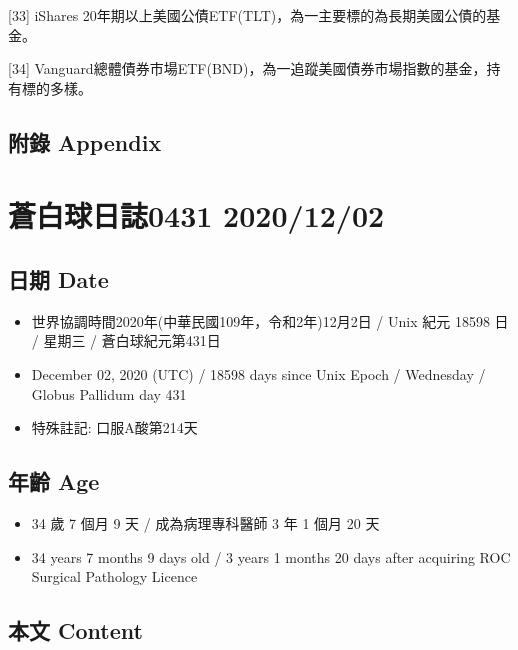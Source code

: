 \documentclass[
]{article}
\providecommand{\tightlist}{%
  \setlength{\itemsep}{0pt}\setlength{\parskip}{0pt}}
\begin{document}
{[}33{]} iShares
20年期以上美國公債ETF(TLT)，為一主要標的為長期美國公債的基金。

{[}34{]}
Vanguard總體債券市場ETF(BND)，為一追蹤美國債券市場指數的基金，持有標的多樣。

\hypertarget{ux9644ux9304-appendix}{%
\subsection{附錄 Appendix}\label{ux9644ux9304-appendix}}

\hypertarget{ux84bcux767dux7403ux65e5ux8a8c0431-20201202}{%
\section{蒼白球日誌0431
2020/12/02}\label{ux84bcux767dux7403ux65e5ux8a8c0431-20201202}}

\hypertarget{ux65e5ux671f-date-1}{%
\subsection{日期 Date}\label{ux65e5ux671f-date-1}}

\begin{itemize}
\tightlist
\item
  世界協調時間2020年(中華民國109年，令和2年)12月2日 / Unix 紀元 18598 日
  / 星期三 / 蒼白球紀元第431日
\item
  December 02, 2020 (UTC) / 18598 days since Unix Epoch / Wednesday /
  Globus Pallidum day 431
\item
  特殊註記: 口服A酸第214天
\end{itemize}

\hypertarget{ux5e74ux9f61-age-1}{%
\subsection{年齡 Age}\label{ux5e74ux9f61-age-1}}

\begin{itemize}
\tightlist
\item
  34 歲 7 個月 9 天 / 成為病理專科醫師 3 年 1 個月 20 天
\item
  34 years 7 months 9 days old / 3 years 1 months 20 days after
  acquiring ROC Surgical Pathology Licence
\end{itemize}

\hypertarget{ux672cux6587-content-1}{%
\subsection{本文 Content}\label{ux672cux6587-content-1}}
\end{document}
